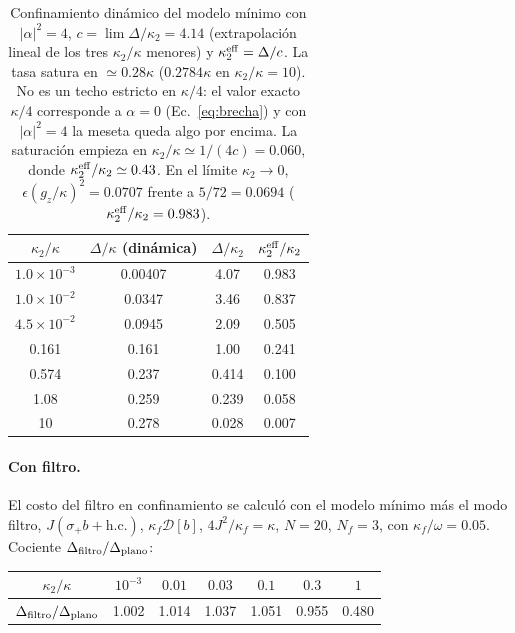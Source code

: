 \documentclass[11pt,a4paper]{article}
\newcommand{\spl}{\sigma_{+}}
\newcommand{\D}{\mathcal{D}}
\theoremstyle{definition}
\begin{document}
\begin{table}[h]
\centering
\begin{tabular}{cccc}
\toprule
$\kappa_2/\kappa$ & $\Delta/\kappa$ (dinámica) & $\Delta/\kappa_2$ & $\kappa_2^{\rm eff}/\kappa_2$\\
\midrule
$1.0\times10^{-3}$ & 0.00407 & 4.07 & 0.983\\
$1.0\times10^{-2}$ & 0.0347 & 3.46 & 0.837\\
$4.5\times10^{-2}$ & 0.0945 & 2.09 & 0.505\\
0.161 & 0.161 & 1.00 & 0.241\\
0.574 & 0.237 & 0.414 & 0.100\\
1.08 & 0.259 & 0.239 & 0.058\\
10 & 0.278 & 0.028 & 0.007\\
\bottomrule
\end{tabular}
\caption{Confinamiento dinámico del modelo mínimo con $|\alpha|^2=4$, $c=\lim\Delta/\kappa_2=4.14$ (extrapolación lineal de los tres $\kappa_2/\kappa$ menores) y $\kappa_2^{\rm eff}=\Delta/c$. La tasa satura en $\simeq0.28\kappa$ ($0.2784\kappa$ en $\kappa_2/\kappa=10$). No es un techo estricto en $\kappa/4$: el valor exacto $\kappa/4$ corresponde a $\alpha=0$ (Ec.~\eqref{eq:brecha}) y con $|\alpha|^2=4$ la meseta queda algo por encima. La saturación empieza en $\kappa_2/\kappa\simeq1/(4c)=0.060$, donde $\kappa_2^{\rm eff}/\kappa_2\simeq0.43$. En el límite $\kappa_2\to0$, $\epsilon(g_z/\kappa)^2=0.0707$ frente a $5/72=0.0694$ ($\kappa_2^{\rm eff}/\kappa_2=0.983$).}
\label{tab:conf}
\end{table}

\paragraph{Con filtro.} El costo del filtro en confinamiento se calculó con el modelo mínimo más el modo filtro, $J(\spl b+\mathrm{h.c.})$, $\kappa_f\D[b]$, $4J^2/\kappa_f=\kappa$, $N=20$, $N_f=3$, con $\kappa_f/\omega=0.05$. Cociente $\Delta_{\rm filtro}/\Delta_{\rm plano}$:

\begin{center}
\begin{tabular}{ccccccc}
\toprule
$\kappa_2/\kappa$ & $10^{-3}$ & $0.01$ & $0.03$ & $0.1$ & $0.3$ & $1$\\
\midrule
$\Delta_{\rm filtro}/\Delta_{\rm plano}$ & 1.002 & 1.014 & 1.037 & 1.051 & 0.955 & 0.480\\
\bottomrule
\end{tabular}
\end{center}
\end{document}
